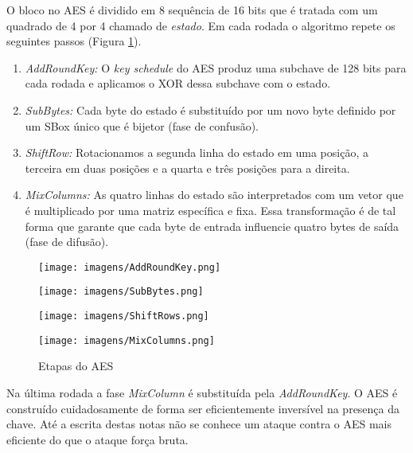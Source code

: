 O bloco no AES é dividido em 8 sequência de 16 bits que é tratada com um quadrado de 4 por 4 chamado de {\em estado}.
Em cada rodada o algoritmo repete os seguintes passos (Figura \ref{fig:aes}).

\begin{enumerate}
\item {\em AddRoundKey:} O {\em key schedule} do AES produz uma subchave de 128 bits para cada rodada e aplicamos o XOR dessa subchave com o estado.
\item {\em SubBytes:} Cada byte do estado é substituído por um novo byte definido por um SBox único que é bijetor (fase de confusão).
\item {\em ShiftRow:} Rotacionamos a segunda linha do estado em uma posição, a terceira em duas posições e a quarta e três posições para a direita.
\item {\em MixColumns:} As quatro linhas do estado são interpretados com um vetor que é multiplicado por uma matriz específica e fixa. Essa transformação é de tal forma que garante que cada byte de entrada influencie quatro bytes de saída (fase de difusão). 
\end{enumerate}

\begin{figure}[!htp]
  \centering
  \begin{minipage}{.45\textwidth}
    \centering
    \texttt{[image: imagens/AddRoundKey.png]}  
  \end{minipage}
 \begin{minipage}{.45\textwidth}
    \centering
    \texttt{[image: imagens/SubBytes.png]}
  \end{minipage}
  \begin{minipage}{.45\textwidth}
    \centering
    \texttt{[image: imagens/ShiftRows.png]}  
  \end{minipage}
 \begin{minipage}{.45\textwidth}
    \centering
    \texttt{[image: imagens/MixColumns.png]}
  \end{minipage}
  \caption{Etapas do AES}
  \label{fig:aes}
\end{figure}

Na última rodada a fase {\em MixColumn} é substituída pela {\em AddRoundKey}.
O AES é construído cuidadosamente de forma ser eficientemente inversível na presença da chave.
Até a escrita destas notas não se conhece um ataque contra o AES mais eficiente do que o ataque força bruta.


